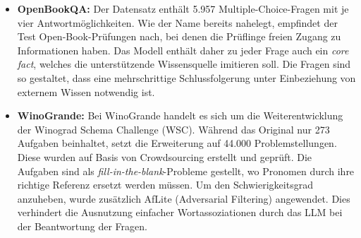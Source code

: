 \begin{itemize}
    \item \textbf{OpenBookQA:} Der Datensatz enthält 5.957 Multiple-Choice-Fragen mit je vier Antwortmöglichkeiten. Wie der Name bereits nahelegt, empfindet der Test Open-Book-Prüfungen nach, bei denen die Prüflinge freien Zugang zu Informationen haben. Das Modell enthält daher zu jeder Frage auch ein \textit{core fact}, welches die unterstützende Wissensquelle imitieren soll. Die Fragen sind so gestaltet, dass eine mehrschrittige Schlussfolgerung unter Einbeziehung von externem Wissen notwendig ist.\autocite[Vgl.][S. 1-2]{mihaylov2018armor}

    \item \textbf{WinoGrande:} Bei WinoGrande handelt es sich um die Weiterentwicklung der Winograd Schema Challenge (WSC). Während das Original nur 273 Aufgaben beinhaltet, setzt die Erweiterung auf 44.000 Problemstellungen. Diese wurden auf Basis von Crowdsourcing erstellt und geprüft. Die Aufgaben sind als \textit{fill-in-the-blank}-Probleme gestellt, wo Pronomen durch ihre richtige Referenz ersetzt werden müssen. Um den Schwierigkeitsgrad anzuheben, wurde zusätzlich AfLite (Adversarial Filtering) angewendet. Dies verhindert die Ausnutzung einfacher Wortassoziationen durch das LLM bei der Beantwortung der Fragen.\autocite[Vgl.][S. 1-3]{sakaguchi2019winogrande}
\end{itemize}

\newpage
